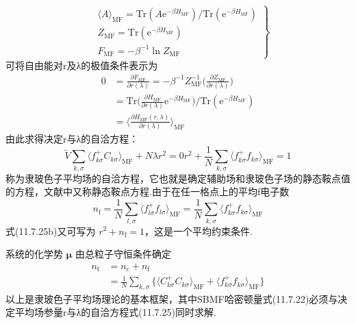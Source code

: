 \begin{equation}
\left.\begin{aligned}
  &\langle A\rangle_{\mathrm{MF}}=\mathrm{Tr}(A\mathrm{e}^{-\beta H_{\mathrm{MF}}})/\mathrm{Tr}(\mathrm{e}^{-\beta H_{\mathrm{MF}}})\\
  &Z_{\mathrm{MF}}=\mathrm{Tr}(\mathrm{e}^{-\beta H_{\mathrm{MF}}})\\
  &F_{\mathrm{MF}}=-\beta^{-1}\ln Z_{\mathrm{MF}}
\end{aligned}\right\}
\end{equation}
可将自由能对r及λ的极值条件表示为
\begin{equation}
\begin{aligned}
  0&=\frac{\partial F_{\mathrm{MF}}}{\partial r(\lambda)}
   =-\beta^{-1}Z_{\mathrm{MF}}^{-1}\biggl(\frac{\partial Z_{\mathrm{MF}}}{\partial r(\lambda)}\biggr)\\
  &=\mathrm{Tr}\biggl(\frac{\partial H_{\mathrm{MF}}}{\partial r(\lambda)}\mathrm{e}^{-\beta H_{\mathrm{MF}}}\biggr)
    /\mathrm{Tr}(\mathrm{e}^{-\beta H_{\mathrm{MF}}})\\
  &=\biggl\langle\frac{\partial H_{\mathrm{MF}}(r,\lambda)}{\partial r(\lambda)}\biggr\rangle_{\mathrm{MF}}
\end{aligned}
\end{equation}
由此求得决定r与λ的自洽方程：
\begin{subequations}
\begin{equation}
  \widetilde{V}\sum_{k,\sigma}\langle f_{k\sigma}^{+}C_{k\sigma}\rangle_{\mathrm{MF}}+N\lambda r^{2}=0
\end{equation}
\begin{equation}
  r^{2}+\frac{1}{N}\sum_{k,\sigma}\langle f_{k\sigma}^{+}f_{k\sigma}\rangle_{\mathrm{MF}}=1
\end{equation}
\end{subequations}
称为隶玻色子平均场的自洽方程，它也就是确定辅助场和隶玻色子场的静态鞍点值的方程，文献中又称静态鞍点方程.由于在任一格点上的平均f电子数
\begin{equation}
  n_{\mathrm{f}}=\frac{1}{N}\sum_{l,\sigma}\langle f_{l\sigma}^{+}f_{l\sigma}\rangle_{\mathrm{MF}}
  =\frac{1}{N}\sum_{k,\sigma}\langle f_{k\sigma}^{+}f_{k\sigma}\rangle_{\mathrm{MF}}
\end{equation}
式(11.7.25b)又可写为 $r^{2}+n_{\mathrm{f}}=1$，这是一个平均约束条件.

系统的化学势 $\boldsymbol{\mu}$ 由总粒子守恒条件确定
\begin{equation}
\begin{aligned}
  n_{\mathrm{t}}&=n_{\mathrm{c}}+n_{\mathrm{f}}\\
  &=\frac{1}{N}\sum_{k,\sigma}\bigl\{\langle C_{k\sigma}^{+}C_{k\sigma}\rangle_{\mathrm{MF}}
  +\langle f_{k\sigma}^{+}f_{k\sigma}\rangle_{\mathrm{MF}}\bigr\}
\end{aligned}
\end{equation}
以上是隶玻色子平均场理论的基本框架，其中SBMF哈密顿量式(11.7.22)必须与决定平均场参量r与λ的自洽方程式(11.7.25)同时求解.

